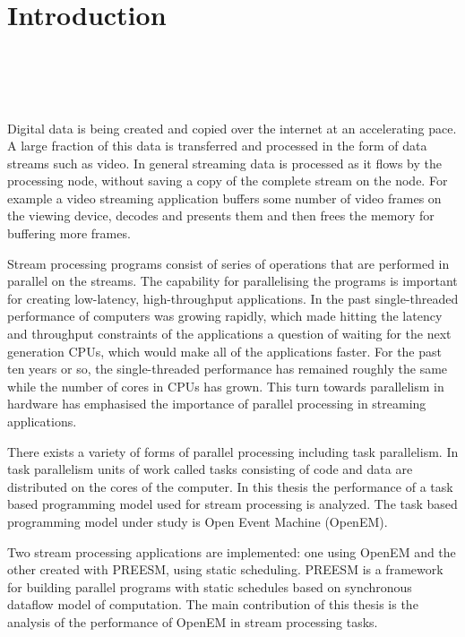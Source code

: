 \chapter{Introduction}
\label{chapter:introduction}
 \\
 \\
 \\
 \\

Digital data is being created and copied over the internet at an accelerating pace. A large fraction of this data is transferred and processed in the form of data streams such as video. In general streaming data is processed as it flows by the processing node, without saving a copy of the complete stream on the node. For example a video streaming application buffers some number of video frames on the viewing device, decodes and presents them and then frees the memory for buffering more frames.

Stream processing programs consist of series of operations that are performed in parallel on the streams. The capability for parallelising the programs is important for creating low-latency, high-throughput applications. In the past single-threaded performance of computers was growing rapidly, which made hitting the latency and throughput constraints of the applications a question of waiting for the next generation CPUs, which would make all of the applications faster. For the past ten years or so, the single-threaded performance has remained roughly the same while the number of cores in CPUs has grown. This turn towards parallelism in hardware has emphasised the importance of parallel processing in streaming applications.

There exists a variety of forms of parallel processing including task parallelism. In task parallelism units of work called tasks consisting of code and data are distributed on the cores of the computer. In this thesis the performance of a task based programming model used for stream processing is analyzed. The task based programming model under study is Open Event Machine (OpenEM).

Two stream processing applications are implemented: one using OpenEM and the other created with PREESM, using static scheduling. PREESM is a framework for building parallel programs with static schedules based on synchronous dataflow model of computation. The main contribution of this thesis is the analysis of the performance of OpenEM in stream processing tasks.

